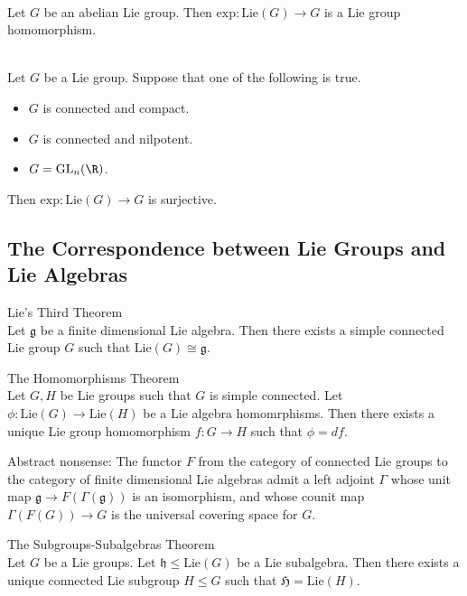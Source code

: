 \documentclass[a4paper]{article}
\begin{document}
\begin{lmm}{}{}\\
Let $G$ be an abelian Lie group. Then $\text{exp}:\text{Lie}(G)\to G$ is a Lie group homomorphism. 
\end{lmm}

\begin{prp}{}{}\\
Let $G$ be a Lie group. Suppose that one of the following is true. 
\begin{itemize}
\item $G$ is connected and compact. 
\item $G$ is connected and nilpotent. 
\item $G=\text{GL}_n(\R)$. 
\end{itemize}
Then $\text{exp}:\text{Lie}(G)\to G$ is surjective. 
\end{prp}

\subsection{The Correspondence between Lie Groups and Lie Algebras}
\begin{thm}{Lie's Third Theorem}{}\\
Let $\mathfrak{g}$ be a finite dimensional Lie algebra. Then there exists a simple connected Lie group $G$ such that $\text{Lie}(G)\cong\mathfrak{g}$. 
\end{thm}

\begin{thm}{The Homomorphisms Theorem}{}\\
Let $G,H$ be Lie groups such that $G$ is simple connected. Let $\phi:\text{Lie}(G)\to\text{Lie}(H)$ be a Lie algebra homomrphisms. Then there exists a unique Lie group homomorphism $f:G\to H$ such that $\phi=df$. 
\end{thm}

Abstract nonsense: The functor $F$ from the category of connected Lie groups to the category of finite dimensional Lie algebras admit a left adjoint $\Gamma$ whose unit map $\mathfrak{g}\to F(\Gamma(\mathfrak{g}))$ is an isomorphism, and whose counit map $\Gamma(F(G))\to G$ is the universal covering space for $G$. 

\begin{thm}{The Subgroups-Subalgebras Theorem}{}\\
Let $G$ be a Lie groups. Let $\mathfrak{h}\leq\text{Lie}(G)$ be a Lie subalgebra. Then there exists a unique connected Lie subgroup $H\leq G$ such that $\mathfrak{H}=\text{Lie}(H)$. 
\end{thm}
\end{document}
